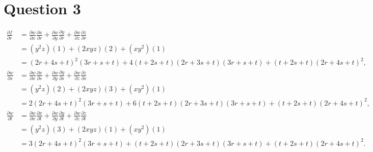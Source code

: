 \documentclass[11pt]{article} %
\begin{document}
\section{Question 3}
\begin{align*}
\frac{\partial f}{\partial r} &= \frac{\partial w}{\partial x}\frac{\partial x}{\partial r} + \frac{\partial w}{\partial y}\frac{\partial y}{\partial r} + \frac{\partial w}{\partial z}\frac{\partial z}{\partial r}\\
&= (y^2z)(1) + (2xyz)(2) + (xy^2)(1) \\
&= (2r+4s+t)^2(3r+s+t) + 4(t+2s+t)(2r+3s+t)(3r+s+t) + (t+2s+t)(2r+4s+t)^2, \\
\frac{\partial w}{\partial s} &= \frac{\partial w}{\partial x}\frac{\partial x}{\partial s} + \frac{\partial w}{\partial y}\frac{\partial y}{\partial s} + \frac{\partial w}{\partial z}\frac{\partial z}{\partial s}\\
&= (y^2z)(2) + (2xyz)(3) + (xy^2)(1)\\
&= 2(2r+4s+t)^2(3r+s+t) + 6(t+2s+t)(2r+3s+t)(3r+s+t) + (t+2s+t)(2r+4s+t)^2, \\
\frac{\partial w}{\partial t} &= \frac{\partial w}{\partial x}\frac{\partial x}{\partial t} + \frac{\partial w}{\partial y}\frac{\partial y}{\partial t} + \frac{\partial w}{\partial z}\frac{\partial z}{\partial t}\\
&= (y^2z)(3) + (2xyz)(1) + (xy^2)(1)\\
&= 3(2r+4s+t)^2(3r+s+t) + (t+2s+t)(2r+3s+t)(3r+s+t) + (t+2s+t)(2r+4s+t)^2 .
\end{align*}
\end{document}
